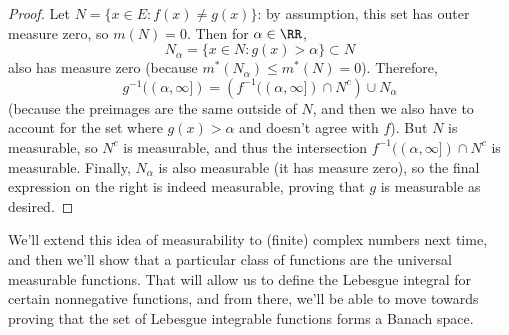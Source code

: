 \begin{proof}
Let $N = \{x \in E: f(x) \ne g(x)\}$: by assumption, this set has outer measure zero, so $m(N) = 0$. Then for $\alpha \in \RR$, 
\[
    N_{\alpha} = \{x \in N: g(x) > \alpha\} \subset N
\]
also has measure zero (because $m^\ast(N_\alpha) \le m^\ast(N) = 0$). Therefore, 
\[
    g^{-1}((\alpha, \infty]) = \left(f^{-1}((\alpha, \infty]) \cap N^c\right) \cup N_\alpha
\]
(because the preimages are the same outside of $N$, and then we also have to account for the set where $g(x) > \alpha$ and doesn't agree with $f$). But $N$ is measurable, so $N^c$ is measurable, and thus the intersection $f^{-1}((\alpha, \infty]) \cap N^c$ is measurable. Finally, $N_\alpha$ is also measurable (it has measure zero), so the final expression on the right is indeed measurable, proving that $g$ is measurable as desired.
\end{proof}

We'll extend this idea of measurability to (finite) complex numbers next time, and then we'll show that a particular class of functions are the universal measurable functions. That will allow us to define the Lebesgue integral for certain nonnegative functions, and from there, we'll be able to move towards proving that the set of Lebesgue integrable functions forms a Banach space.